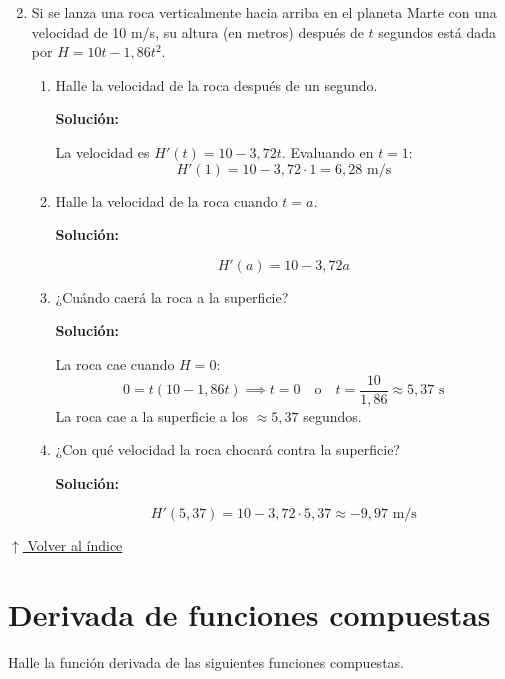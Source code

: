 \documentclass[12pt]{article}
\newcommand{\solucion}{%
    \vspace{0.8em}%
    \textbf{Solución:}%
}
\newcommand{\volverindice}{%
    \vspace{1em}%
    \begin{flushright}%
        \hyperlink{indice}{\small $\uparrow$ Volver al índice}%
    \end{flushright}%
}
\begin{document}
\begin{enumerate}[label=\alph*.-]
    \setcounter{enumi}{1} %
    \item Si se lanza una roca verticalmente hacia arriba en el planeta Marte con una velocidad de 10 m/s, su altura (en metros) después de $t$ segundos está dada por $H = 10t - 1{,}86t^2$.

    \begin{enumerate}[label=\roman*.-]
        \item Halle la velocidad de la roca después de un segundo.

        \solucion

        La velocidad es $H'(t) = 10 - 3{,}72t$. Evaluando en $t = 1$:
        \[
            H'(1) = 10 - 3{,}72 \cdot 1 = \boxed{6{,}28 \text{ m/s}}
        \]

        \item Halle la velocidad de la roca cuando $t = a$.

        \solucion

        \[
            H'(a) = 10 - 3{,}72a
        \]

        \item ¿Cuándo caerá la roca a la superficie?

        \solucion

        La roca cae cuando $H = 0$:
        \[
            0 = t(10 - 1{,}86t) \implies t = 0 \quad \text{o} \quad t = \frac{10}{1{,}86} \approx 5{,}37 \text{ s}
        \]
        La roca cae a la superficie a los $\approx 5{,}37$ segundos.

        \item ¿Con qué velocidad la roca chocará contra la superficie?

        \solucion

        \[
            H'(5{,}37) = 10 - 3{,}72 \cdot 5{,}37 \approx \boxed{-9{,}97 \text{ m/s}}
        \]

    \end{enumerate}
\end{enumerate}

\volverindice
\newpage

\section{Derivada de funciones compuestas}

Halle la función derivada de las siguientes funciones compuestas.
\end{document}
